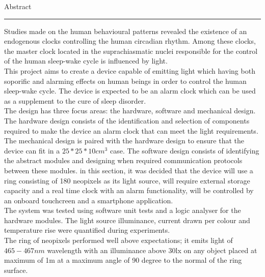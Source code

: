 {\Large Abstract}\\
\hrule
\vskip 10mm
Studies made on the human behavioural patterns revealed the existence of an endogenous clocks controlling the human circadian rhythm. Among these clocks, the master clock located in the suprachiasmatic nuclei responsible for the control of the human sleep-wake cycle is influenced by 
light. \\
This project aims to create a device capable of emitting light which having both soporific and alarming effects on human beings in order to control the human sleep-wake cycle. The device is expected to be an alarm clock which can be used as a supplement to the cure of sleep disorder.\\
The design has three focus areas: the hardware, software and mechanical design. The hardware design consists of the identification and selection of components required to make the device an alarm clock that can meet the light requirements. The mechanical design is paired with the hardware design to ensure that the device can fit in a $25*25*10cm^3$ case. The software design consists of identifying the abstract modules and designing when required communication protocols between these modules. in this section, it was decided that the device will use a ring consisting of 180 neopixels as its light source, will require external storage capacity and a real time clock with an alarm functionality, will be controlled by an onboard touchcreen and a smartphone application.\\
The system was tested using software unit tests and a logic analyser for the hardware modules. The light source illuminance, current drawn per colour and temperature rise were quantified during experiments.\\
The ring of neopixels performed well above expectations; it emits light of $465-467nm$ wavelength with an illuminance above 30lx on any object placed at maximum of 1m at a maximum angle of 90 degree to the normal of the ring surface. 

 